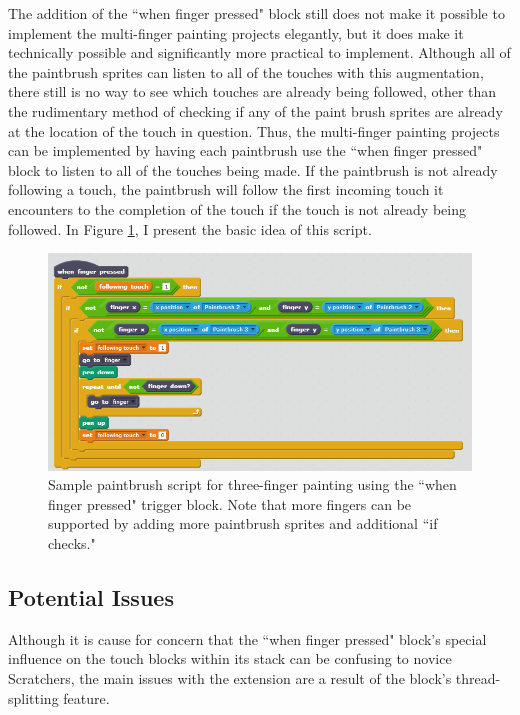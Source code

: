 The addition of the ``when finger pressed" block still does not make it possible to implement the multi-finger painting projects elegantly, but it does make it technically possible and significantly more practical to implement. Although all of the paintbrush sprites can listen to all of the touches with this augmentation, there still is no way to see which touches are already being followed, other than the rudimentary method of checking if any of the paint brush sprites are already at the location of the touch in question. Thus, the multi-finger painting projects can be implemented by having each paintbrush use the ``when finger pressed" block to listen to all of the touches being made. If the paintbrush is not already following a touch, the paintbrush will follow the first incoming touch it encounters to the completion of the touch if the touch is not already being followed. In Figure \ref{MultiFingerPaintingCFD}, I present the basic idea of this script.

\begin{figure}
\centering
\includegraphics[width=1.0\textwidth]{images/MultiFingerPaintingCFD.PNG}
\caption[Sample Script For Multi-Finger Painting Using the Closest Finger Design Extension]{Sample paintbrush script for three-finger painting using the ``when finger pressed" trigger block. Note that more fingers can be supported by adding more paintbrush sprites and additional ``if checks."}
\label{MultiFingerPaintingCFD}
\end{figure}

\subsection{Potential Issues}
Although it is cause for concern that the ``when finger pressed" block's special influence on the touch blocks within its stack can be confusing to novice Scratchers, the main issues with the extension are a result of the block's thread-splitting feature.


